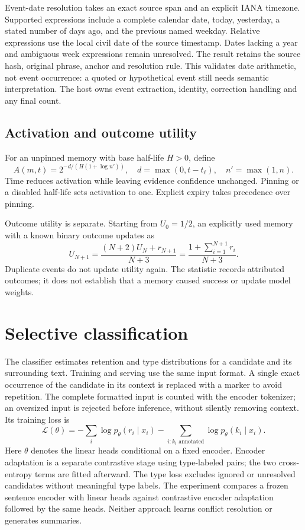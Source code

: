 \documentclass[11pt]{article}
\begin{document}
Event-date resolution takes an exact source span and an explicit IANA timezone. Supported expressions include a complete calendar date, today, yesterday, a stated number of days ago, and the previous named weekday. Relative expressions use the local civil date of the source timestamp. Dates lacking a year and ambiguous week expressions remain unresolved. The result retains the source hash, original phrase, anchor and resolution rule. This validates date arithmetic, not event occurrence: a quoted or hypothetical event still needs semantic interpretation. The host owns event extraction, identity, correction handling and any final count.

\subsection{Activation and outcome utility}
For an unpinned memory with base half-life $H>0$, define
\[
 A(m,t)=2^{-d/(H(1+\log n'))},\quad
 d=\max(0,t-t_\ell),\quad n'=\max(1,n).
\]
Time reduces activation while leaving evidence confidence unchanged. Pinning or a disabled half-life sets activation to one. Explicit expiry takes precedence over pinning.

Outcome utility is separate. Starting from $U_0=1/2$, an explicitly used memory with a known binary outcome updates as
\[
 U_{N+1}=\frac{(N+2)U_N+r_{N+1}}{N+3}
        =\frac{1+\sum_{i=1}^{N+1}r_i}{N+3}.
\]
Duplicate events do not update utility again. The statistic records attributed outcomes; it does not establish that a memory caused success or update model weights.

\section{Selective classification}
The classifier estimates retention and type distributions for a candidate and its surrounding text. Training and serving use the same input format. A single exact occurrence of the candidate in its context is replaced with a marker to avoid repetition. The complete formatted input is counted with the encoder tokenizer; an oversized input is rejected before inference, without silently removing context. Its training loss is
\[
 \mathcal{L}(\theta)=
 -\sum_i\log p_\theta(r_i\mid x_i)
 -\sum_{i:k_i\text{ annotated}}\log p_\theta(k_i\mid x_i).
\]
Here $\theta$ denotes the linear heads conditional on a fixed encoder. Encoder adaptation is a separate contrastive stage using type-labeled pairs; the two cross-entropy terms are fitted afterward. The type loss excludes ignored or unresolved candidates without meaningful type labels. The experiment compares a frozen sentence encoder with linear heads against contrastive encoder adaptation followed by the same heads. Neither approach learns conflict resolution or generates summaries.
\end{document}
